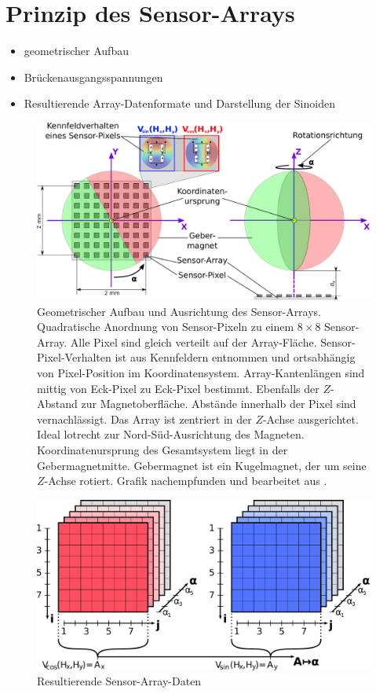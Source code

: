 %

\section{Prinzip des Sensor-Arrays}\label{sec:prinzip-des-sensor-arrays}
\begin{itemize}
	\item geometrischer Aufbau
	\item Brückenausgangsspannungen
	\item Resultierende Array-Datenformate und Darstellung der Sinoiden
\end{itemize}


\begin{figure}[tbph]
	\centering
	\includegraphics[width=.9\linewidth]{chapters/images/2-Grundlagen/Sensor-Array-Prinzip}
	\caption[Geometrischer Aufbau und Ausrichtung des Sensor-Arrays]{Geometrischer Aufbau und Ausrichtung des Sensor-Arrays. Quadratische Anordnung von Sensor-Pixeln zu einem $8 \times 8$ Sensor-Array. Alle Pixel sind gleich verteilt auf der Array-Fläche. Sensor-Pixel-Verhalten ist aus Kennfeldern entnommen und ortsabhängig von Pixel-Position im Koordinatensystem. Array-Kantenlängen sind mittig von Eck-Pixel zu Eck-Pixel bestimmt. Ebenfalls der $Z$-Abstand zur Magnetoberfläche. Abstände innerhalb der Pixel sind vernachlässigt. Das Array ist zentriert in der $Z$-Achse ausgerichtet. Ideal lotrecht zur Nord-Süd-Ausrichtung des Magneten. Koordinatenursprung des Gesamtsystem liegt in der Gebermagnetmitte. Gebermagnet ist ein Kugelmagnet, der um seine $Z$-Achse rotiert. Grafik nachempfunden und bearbeitet aus \cite{Schuethe2020b}.}
	\label{fig:sensor-array-prinzip}
\end{figure}


\begin{figure}[tbph]
	\centering
	\includegraphics[width=0.9\linewidth]{chapters/images/2-Grundlagen/Sensor-Array-Daten}
	\caption[Resultierende Sensor-Array-Daten]{Resultierende Sensor-Array-Daten}
	\label{fig:sensor-array-daten}
\end{figure}

\clearpage